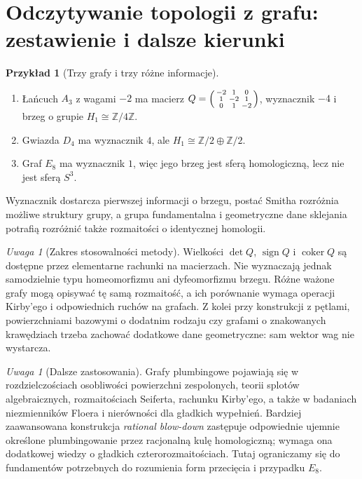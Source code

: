 \documentclass[11pt,a4paper]{report}
\numberwithin{equation}{section}
\theoremstyle{plain}
\theoremstyle{definition}
\newtheorem{przyklad}[twierdzenie]{Przykład}
\theoremstyle{remark}
\newtheorem{uwaga}[twierdzenie]{Uwaga}
\begin{document}
\section{Odczytywanie topologii z grafu: zestawienie i dalsze kierunki}
\label{sec:tg-plumbing-conclusions}

\begin{przyklad}[Trzy grafy i trzy różne informacje]
\begin{enumerate}[label=(\roman*)]
\item Łańcuch $A_3$ z wagami $-2$ ma macierz
$Q=\begin{psmallmatrix}-2&1&0\\1&-2&1\\0&1&-2\end{psmallmatrix}$,
wyznacznik $-4$ i brzeg o grupie $H_1\cong\mathbb Z/4\mathbb Z$.
\item Gwiazda $D_4$ ma wyznacznik $4$, ale
$H_1\cong\mathbb Z/2\oplus\mathbb Z/2$.
\item Graf $E_8$ ma wyznacznik $1$, więc jego brzeg jest
sferą homologiczną, lecz nie jest sferą $S^3$.
\end{enumerate}
Wyznacznik dostarcza pierwszej informacji o brzegu,
postać Smitha rozróżnia możliwe struktury grupy,
a grupa fundamentalna i geometryczne dane sklejania
potrafią rozróżnić także rozmaitości o identycznej homologii.
\end{przyklad}

\begin{uwaga}[Zakres stosowalności metody]
Wielkości $\det Q$, $\operatorname{sign}Q$ i
$\operatorname{coker}Q$ są dostępne przez elementarne rachunki
na macierzach. Nie wyznaczają jednak samodzielnie
typu homeomorfizmu ani dyfeomorfizmu brzegu.
Różne ważone grafy mogą opisywać tę samą rozmaitość,
a ich porównanie wymaga operacji Kirby'ego i odpowiednich
ruchów na grafach. Z kolei przy konstrukcji z pętlami,
powierzchniami bazowymi o dodatnim rodzaju czy grafami
o znakowanych krawędziach trzeba zachować dodatkowe
dane geometryczne: sam wektor wag nie wystarcza.
\end{uwaga}

\begin{uwaga}[Dalsze zastosowania]
Grafy plumbingowe pojawiają się w rozdzielczościach
osobliwości powierzchni zespolonych, teorii splotów
algebraicznych, rozmaitościach Seiferta, rachunku Kirby'ego,
a także w badaniach niezmienników Floera i nierówności
dla gładkich wypełnień. Bardziej zaawansowana konstrukcja
\emph{rational blow-down} zastępuje odpowiednie ujemnie
określone plumbingowanie przez racjonalną kulę homologiczną;
wymaga ona dodatkowej wiedzy o gładkich czterorozmaitościach.
Tutaj ograniczamy się do fundamentów potrzebnych do
rozumienia form przecięcia i przypadku $E_8$.
\end{uwaga}
\end{document}
